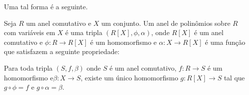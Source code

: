 Uma tal forma é a seguinte.
\begin{definition}\label{definition:polinomio_propUniversal}
    Seja $R$ um anel comutativo e $X$ um conjunto.
    Um anel de polinômios sobre $R$ com variáveis em $X$ é uma tripla $(R[X], \phi, \alpha)$, onde $R[X]$ é um anel comutativo e $\phi:R\rightarrow R[X]$ é um homomorfismo e $\alpha:X\rightarrow R[X]$ é uma função que satisfazem a seguinte propriedade:

    Para toda tripla $(S, f, \beta)$ onde $S$ é um anel comutativo, $f:R\rightarrow S$ é um homomorfismo e$\beta:X\rightarrow S$, existe um único homomorfismo $g:R[X]\rightarrow S$ tal que $g\circ \phi=f$ e $g\circ \alpha=\beta$.
    \begin{figure}[H]
        \centering
    \end{figure}
\end{definition}

